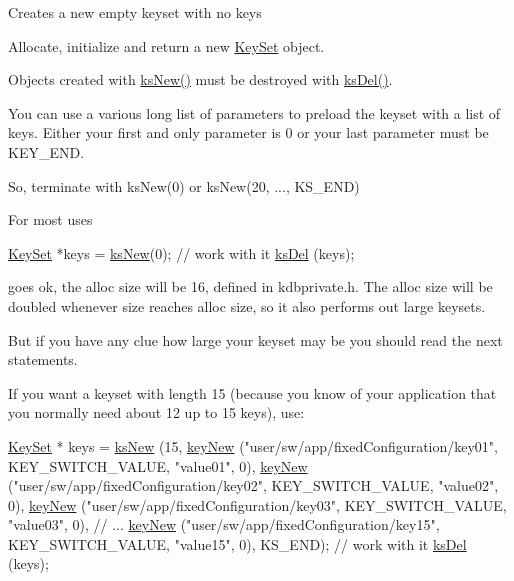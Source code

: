 Creates a new empty keyset with no keys

Allocate, initialize and return a new \hyperlink{classkdb_1_1KeySet}{Key\-Set} object.

Objects created with \hyperlink{group__keyset_ga671e1aaee3ae9dc13b4834a4ddbd2c3c}{ks\-New()} must be destroyed with \hyperlink{group__keyset_ga27e5c16473b02a422238c8d970db7ac8}{ks\-Del()}.

You can use a various long list of parameters to preload the keyset with a list of keys. Either your first and only parameter is 0 or your last parameter must be K\-E\-Y\-\_\-\-E\-N\-D.

So, terminate with ks\-New(0) or ks\-New(20, ..., K\-S\-\_\-\-E\-N\-D)

For most uses 
\begin{DoxyCode}
\hyperlink{classkdb_1_1KeySet_a4eac9850fa4f06c07a5306befc3e4377}{KeySet} *keys = \hyperlink{group__keyset_ga671e1aaee3ae9dc13b4834a4ddbd2c3c}{ksNew}(0);
\textcolor{comment}{// work with it}
\hyperlink{group__keyset_ga27e5c16473b02a422238c8d970db7ac8}{ksDel} (keys);
\end{DoxyCode}
 goes ok, the alloc size will be 16, defined in kdbprivate.\-h. The alloc size will be doubled whenever size reaches alloc size, so it also performs out large keysets.

But if you have any clue how large your keyset may be you should read the next statements.

If you want a keyset with length 15 (because you know of your application that you normally need about 12 up to 15 keys), use\-: 
\begin{DoxyCode}
\hyperlink{classkdb_1_1KeySet_a4eac9850fa4f06c07a5306befc3e4377}{KeySet} * keys = \hyperlink{group__keyset_ga671e1aaee3ae9dc13b4834a4ddbd2c3c}{ksNew} (15,
        \hyperlink{group__key_gad23c65b44bf48d773759e1f9a4d43b89}{keyNew} (\textcolor{stringliteral}{"user/sw/app/fixedConfiguration/key01"}, KEY\_SWITCH\_VALUE,
       \textcolor{stringliteral}{"value01"}, 0),
        \hyperlink{group__key_gad23c65b44bf48d773759e1f9a4d43b89}{keyNew} (\textcolor{stringliteral}{"user/sw/app/fixedConfiguration/key02"}, KEY\_SWITCH\_VALUE,
       \textcolor{stringliteral}{"value02"}, 0),
        \hyperlink{group__key_gad23c65b44bf48d773759e1f9a4d43b89}{keyNew} (\textcolor{stringliteral}{"user/sw/app/fixedConfiguration/key03"}, KEY\_SWITCH\_VALUE,
       \textcolor{stringliteral}{"value03"}, 0),
        \textcolor{comment}{// ...}
        \hyperlink{group__key_gad23c65b44bf48d773759e1f9a4d43b89}{keyNew} (\textcolor{stringliteral}{"user/sw/app/fixedConfiguration/key15"}, KEY\_SWITCH\_VALUE,
       \textcolor{stringliteral}{"value15"}, 0),
        KS\_END);
\textcolor{comment}{// work with it}
\hyperlink{group__keyset_ga27e5c16473b02a422238c8d970db7ac8}{ksDel} (keys);
\end{DoxyCode}


